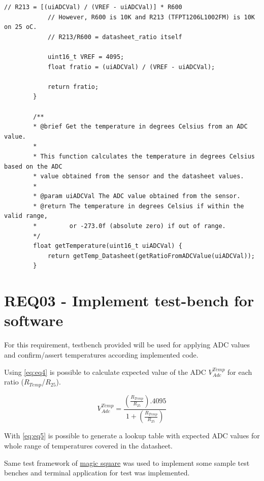 \documentclass{article}
\begin{document}
\begin{lstlisting}[caption={C Code for Temperature Sensor}, label=code:temperature_sensor]
			// R213 = [(uiADCVal) / (VREF - uiADCVal)] * R600
			// However, R600 is 10K and R213 (TFPT1206L1002FM) is 10K on 25 oC.
			// R213/R600 = datasheet_ratio itself
			
			uint16_t VREF = 4095;
			float fratio = (uiADCVal) / (VREF - uiADCVal);
			
			return fratio;
		}
		
		/**
		* @brief Get the temperature in degrees Celsius from an ADC value.
		*
		* This function calculates the temperature in degrees Celsius based on the ADC
		* value obtained from the sensor and the datasheet values.
		*
		* @param uiADCVal The ADC value obtained from the sensor.
		* @return The temperature in degrees Celsius if within the valid range,
		*         or -273.0f (absolute zero) if out of range.
		*/
		float getTemperature(uint16_t uiADCVal) {
			return getTemp_Datasheet(getRatioFromADCValue(uiADCVal));
		}
			\end{lstlisting}
	


	
	\section{REQ03 - Implement test-bench for software}
	For this requirement, testbench provided will be used for applying ADC values and confirm/assert temperatures according implemented code.
	
	Using \eqref{eq:eq4} is possible to calculate expected value of the ADC \(V_{Adc}^{Temp}\) for
	each ratio (\(R_{Temp}\)/\(R_{25}\)).
	
	\begin{equation}
	V_{Adc}^{Temp} = \frac{ (\frac{R_{Temp}}{R_{25}}).4095}{1 + (\frac{R_{Temp}}{R_{25}})}
	\label{eq:eq5}
	\end{equation}
	
	With \eqref{eq:eq5} is possible to generate a lookup table with expected ADC values for whole range of temperatures covered in the datasheet.
	
	Same test framework of \underline{magic square} was used to implement some sample test benches and terminal application for test was implemented.
		
\end{document}
